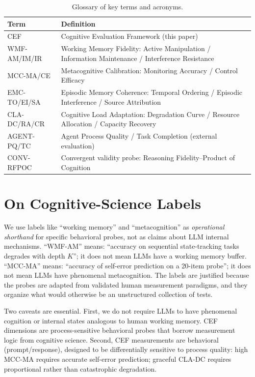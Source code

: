 \documentclass{article}
\begin{document}
\begin{table}[h]
\centering
\footnotesize
\caption{Glossary of key terms and acronyms.}
\label{tab:glossary}
\begin{tabular}{@{}lp{9cm}@{}}
\toprule
\textbf{Term} & \textbf{Definition} \\
\midrule
CEF & Cognitive Evaluation Framework (this paper) \\
WMF-AM/IM/IR & Working Memory Fidelity: Active Manipulation / Information Maintenance / Interference Resistance \\
MCC-MA/CE & Metacognitive Calibration: Monitoring Accuracy / Control Efficacy \\
EMC-TO/EI/SA & Episodic Memory Coherence: Temporal Ordering / Episodic Interference / Source Attribution \\
CLA-DC/RA/CR & Cognitive Load Adaptation: Degradation Curve / Resource Allocation / Capacity Recovery \\
AGENT-PQ/TC & Agent Process Quality / Task Completion (external evaluation) \\
CONV-RFPOC & Convergent validity probe: Reasoning Fidelity--Product of Cognition \\
\bottomrule
\end{tabular}
\end{table}

\section{On Cognitive-Science Labels}
\label{app:labels}

We use labels like ``working memory'' and ``metacognition'' as
\emph{operational shorthand} for specific behavioral probes, not as
claims about LLM internal mechanisms. ``WMF-AM'' means: ``accuracy on
sequential state-tracking tasks degrades with depth $K$''; it does not
mean LLMs have a working memory buffer. ``MCC-MA'' means: ``accuracy
of self-error prediction on a 20-item probe''; it does not mean LLMs
have phenomenal metacognition. The labels are justified because the
probes are adapted from validated human measurement paradigms, and they
organize what would otherwise be an unstructured collection of tests.

Two caveats are essential. First, we do not require LLMs to have
phenomenal cognition or internal states analogous to human working memory.
CEF dimensions are process-sensitive behavioral probes that borrow
measurement logic from cognitive science. Second, CEF measurements are
behavioral (prompt/response), designed to be differentially sensitive to
process quality: high MCC-MA requires accurate self-error prediction;
graceful CLA-DC requires proportional rather than catastrophic
degradation.
\end{document}
